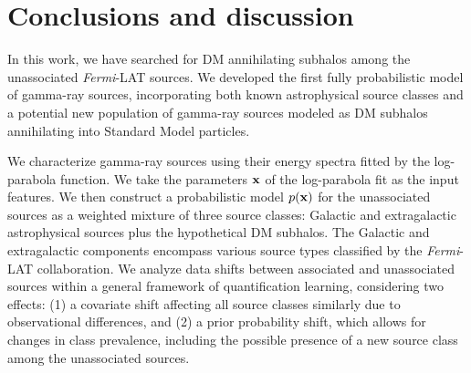 \documentclass[12pt, a4paper]{article}
\newcommand{\Fermi}{{\textit{Fermi}}}
\newcommand{\sigmav}{\langle \sigma v \rangle}
\begin{document}

\section{Conclusions and discussion}
\label{sec:conclusions}
In this work, we have searched for DM annihilating subhalos among the unassociated \Fermi-LAT sources. We developed the first fully probabilistic model of gamma-ray sources, incorporating both known astrophysical source classes and a potential new population of gamma-ray sources modeled as DM subhalos annihilating into Standard Model particles. 

We characterize gamma-ray sources using their  energy spectra fitted by the log-parabola function.
We take the parameters $\bf x$ of the log-parabola fit as the input features. 
We then
construct a probabilistic model $p({\bf x})$ for the unassociated sources as a weighted mixture of three source classes: Galactic and extragalactic astrophysical sources plus the hypothetical DM subhalos. The Galactic and extragalactic components encompass various source types classified by the \Fermi-LAT collaboration. We analyze data shifts between associated and unassociated sources within a general framework of quantification learning, considering two effects: (1) a covariate shift affecting all source classes similarly due to observational differences, and (2) a prior probability shift, which allows for changes in class prevalence, including the possible presence of a new source class among the unassociated sources.
\end{document}
